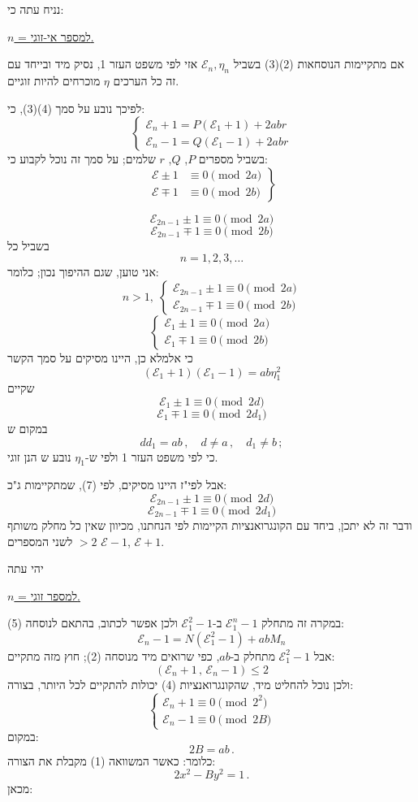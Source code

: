 \noindent נניח עתה כי:

\medskip
\noindent\underline{$n$ = למספר אי-זוגי.}

\noindent אם מתקיימות הנוסחאות (2)(3) בשביל $\mathcal{E}_n, \eta_n$ אזי לפי משפט העזר 1, נסיק מיד ובייחד עם זה כל הערכים $\eta$ מוכרחים להיות זוגיים.

\noindent לפיכך נובע על סמך (4)(3), כי:
\[ \begin{cases} \mathcal{E}_n + 1 = P(\mathcal{E}_1 + 1) + 2abr \\ \mathcal{E}_n - 1 = Q(\mathcal{E}_1 - 1) + 2abr \end{cases} \]
בשביל מספרים $P$, $Q$, $r$ שלמים; על סמך זה נוכל לקבוע כי:
\[ \left. \begin{aligned} \mathcal{E} \pm 1 &\equiv 0 \pmod{2a} \\ \mathcal{E} \mp 1 &\equiv 0 \pmod{2b} \end{aligned} \right\} \tag{7} \]

\[ \mathcal{E}_{2n-1} \pm 1 \equiv 0 \pmod{2a} \]
\[ \mathcal{E}_{2n-1} \mp 1 \equiv 0 \pmod{2b} \]
בשביל כל
\[ n = 1 , 2 , 3 , \ldots \]
אני טוען, שגם ההיפוך נכון; כלומר:
\[ n > 1 , \; \begin{cases} \mathcal{E}_{2n-1} \pm 1 \equiv 0 \pmod{2a} \\ \mathcal{E}_{2n-1} \mp 1 \equiv 0 \pmod{2b} \end{cases} \]
\[ \begin{cases} \mathcal{E}_1 \pm 1 \equiv 0 \pmod{2a} \\ \mathcal{E}_1 \mp 1 \equiv 0 \pmod{2b} \end{cases} \tag{8} \]
כי אלמלא כן, היינו מסיקים על סמך הקשר
\[ (\mathcal{E}_1 + 1)(\mathcal{E}_1 - 1) = ab\eta_1^2 \]
שקיים
\[ \mathcal{E}_1 \pm 1 \equiv 0 \pmod{2d} \]
\[ \mathcal{E}_1 \mp 1 \equiv 0 \pmod{2d_1} \]
במקום ש
\[ dd_1 = ab \, , \quad d \neq a \, , \quad d_1 \neq b \, ; \]
כי לפי משפט העזר 1 ולפי ש-$\eta_1$ נובע ש הנן זוגי.

\noindent אבל לפי"ז היינו מסיקים, לפי (7), שמתקיימות ג"כ:
\[ \mathcal{E}_{2n-1} \pm 1 \equiv 0 \pmod{2d} \]
\[ \mathcal{E}_{2n-1} \mp 1 \equiv 0 \pmod{2d_1} \]
ודבר זה לא יתכן, ביחד עם הקונגרואנציות הקיימות לפי הנחתנו, מכיוון שאין כל מחלק משותף $>2$ לשני המספרים $\mathcal{E}-1$, $\mathcal{E}+1$.

\noindent יהי עתה

\medskip
\noindent\underline{$n$ = למספר זוגי.}

\noindent במקרה זה מתחלק $\mathcal{E}_1^n - 1$ ב-$\mathcal{E}_1^2 - 1$ ולכן אפשר לכתוב, בהתאם לנוסחה (5):
\[ \mathcal{E}_n - 1 = N(\mathcal{E}_1^2 - 1) + abM_n \tag{9} \]
אבל $\mathcal{E}_1^2 - 1$ מתחלק ב-$ab$, כפי שרואים מיד מנוסחה (2); חוץ מזה מתקיים:
\[ (\mathcal{E}_n + 1 \, , \, \mathcal{E}_n - 1) \leq 2 \]
ולכן נוכל להחליט מיד, שהקונגרואנציות (4) יכולות להתקיים לכל היותר, בצורה:
\[ \begin{cases} \mathcal{E}_n + 1 \equiv 0 \pmod{2^2} \\ \mathcal{E}_n - 1 \equiv 0 \pmod{2B} \end{cases} \tag{10} \]
במקום:
\[ 2B = ab \, . \]
כלומר: כאשר המשוואה (1) מקבלת את הצורה:
\[ 2x^2 - By^2 = 1 \, . \tag{11} \]
מכאן:

